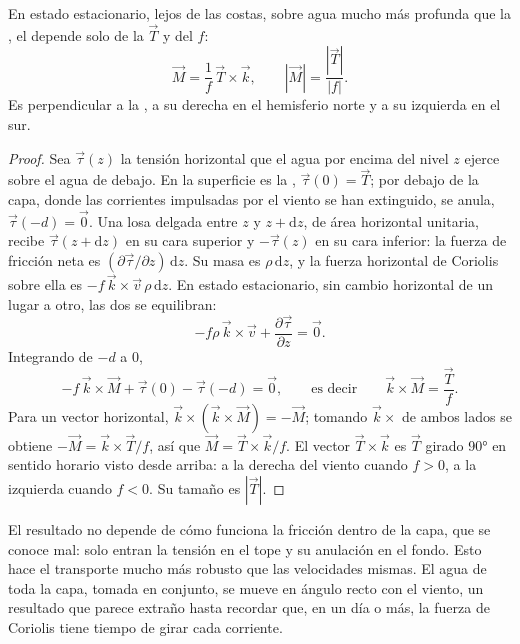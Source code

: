 \begin{theorem}\label{thm:b1:ocean-circulation:ekman}
En estado estacionario, lejos de las costas, sobre agua mucho más profunda que la , el  depende solo de la  $\vec T$ y del  $f$:
\[
  \vec M = \frac{1}{f}\,\vec T\times\vec k,
  \qquad |\vec M| = \frac{|\vec T|}{|f|}.
\]
Es perpendicular a la , a su derecha en el hemisferio norte y a su izquierda en el sur.
\end{theorem}

\begin{proof}
Sea $\vec\tau(z)$ la tensión horizontal que el agua por encima del nivel $z$ ejerce sobre el agua de debajo. En la superficie es la , $\vec\tau(0) =
\vec T$; por debajo de la capa, donde las corrientes impulsadas por el viento se han extinguido, se anula, $\vec\tau(-d) = \vec 0$. Una losa delgada entre $z$ y $z + \mathrm dz$, de área horizontal unitaria, recibe $\vec\tau(z + \mathrm dz)$ en su cara superior y
$-\vec\tau(z)$ en su cara inferior: la fuerza de fricción neta es $(\partial\vec
\tau/\partial z)\,\mathrm dz$. Su masa es $\rho\,\mathrm dz$, y la fuerza horizontal de Coriolis sobre ella es $-f\,\vec k\times\vec v\,\rho\,\mathrm dz$. En estado estacionario, sin cambio horizontal de un lugar a otro, las dos se equilibran:
\[
  -f\rho\,\vec k\times\vec v + \frac{\partial\vec\tau}{\partial z} = \vec 0 .
\]
Integrando de $-d$ a $0$,
\[
  -f\,\vec k\times\vec M + \vec\tau(0) - \vec\tau(-d) = \vec 0,
  \qquad\text{es decir}\qquad \vec k\times\vec M = \frac{\vec T}{f}.
\]
Para un vector horizontal, $\vec k\times(\vec k\times\vec M) = -\vec M$; tomando
$\vec k\times$ de ambos lados se obtiene $-\vec M = \vec k\times\vec T/f$, así que $\vec M =
\vec T\times\vec k/f$. El vector $\vec T\times\vec k$ es $\vec T$ girado
\ang{90} en sentido horario visto desde arriba: a la derecha del viento cuando $f > 0$, a la izquierda cuando $f < 0$. Su tamaño es $|\vec T|$.
\end{proof}

El resultado no depende de cómo funciona la fricción dentro de la capa, que se conoce mal: solo entran la tensión en el tope y su anulación en el fondo. Esto hace el transporte mucho más robusto que las velocidades mismas. El agua de toda la capa, tomada en conjunto, se mueve en ángulo recto con el viento, un resultado que parece extraño hasta recordar que, en un día o más, la fuerza de Coriolis tiene tiempo de girar cada corriente.

